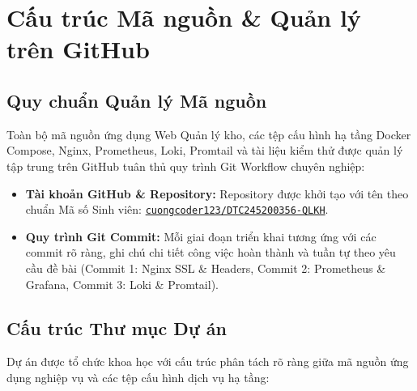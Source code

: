 \documentclass[12pt,a4paper,oneside]{report}
\begin{document}
\chapter{Cấu trúc Mã nguồn \& Quản lý trên GitHub}

\section{Quy chuẩn Quản lý Mã nguồn}
Toàn bộ mã nguồn ứng dụng Web Quản lý kho, các tệp cấu hình hạ tầng Docker Compose, Nginx, Prometheus, Loki, Promtail và tài liệu kiểm thử được quản lý tập trung trên GitHub tuân thủ quy trình Git Workflow chuyên nghiệp:
\begin{itemize}
    \item \textbf{Tài khoản GitHub \& Repository:} Repository được khởi tạo với tên theo chuẩn Mã số Sinh viên: \href{https://github.com/cuongcoder123/DTC245200356-QLKH}{\texttt{cuongcoder123/DTC245200356-QLKH}}.
    \item \textbf{Quy trình Git Commit:} Mỗi giai đoạn triển khai tương ứng với các commit rõ ràng, ghi chú chi tiết công việc hoàn thành và tuần tự theo yêu cầu đề bài (Commit 1: Nginx SSL \& Headers, Commit 2: Prometheus \& Grafana, Commit 3: Loki \& Promtail).
\end{itemize}

\section{Cấu trúc Thư mục Dự án}
Dự án được tổ chức khoa học với cấu trúc phân tách rõ ràng giữa mã nguồn ứng dụng nghiệp vụ và các tệp cấu hình dịch vụ hạ tầng:

\begin{tcolorbox}[
    enhanced,
    colback=codebg,
    colframe=codeborder,
    arc=2mm,
    title=\textbf{\color{darknavy}Sơ đồ Cây Thư mục Hệ thống},
    fonttitle=\small\bfseries
]
\end{tcolorbox}
\end{document}
